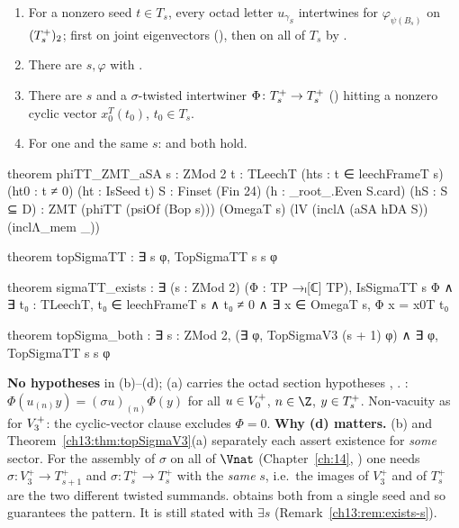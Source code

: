 \begin{theorem}\label{ch13:thm:topSigmaTT}
\begin{enumerate}[label=(\alph*)]
\item For a nonzero seed $t\in T_s$, every octad letter $u_{\gamma_S}$ intertwines for $\varphi_{\psi(B_s)}$ on
  $(T_{s}^{+})_2$; first on joint eigenvectors (), then on all of $T_s$ by .
\item There are $s,\varphi$ with .
\item There are $s$ and a $\sigma$-twisted intertwiner $\Phi\colon T_{s}^{+}\to T_{s}^{+}$ ()
  hitting a nonzero cyclic vector $x_0^T(t_0)$, $t_0\in T_s$.
\item For one and the same $s$:  and  both hold.
\end{enumerate}
\end{theorem}
\begin{leancode}
theorem phiTT_ZMT_aSA {s : ZMod 2} {t : TLeechT} (hts : t ∈ leechFrameT s) (ht0 : t ≠ 0)
    (ht : IsSeed t) {S : Finset (Fin 24)} (h : _root_.Even S.card) (hS : S ⊆ D) :
    ZMT (phiTT (psiOf (Bop s))) (OmegaT s) (lV (inclΛ (aSA hDA S)) (inclΛ_mem _))

theorem topSigmaTT : ∃ s φ, TopSigmaTT s s φ

theorem sigmaTT_exists :
    ∃ (s : ZMod 2) (Φ : TP →ₗ[ℂ] TP), IsSigmaTT s Φ ∧
      ∃ t₀ : TLeechT, t₀ ∈ leechFrameT s ∧ t₀ ≠ 0 ∧ ∃ x ∈ OmegaT s, Φ x = x0T t₀

theorem topSigma_both : ∃ s : ZMod 2, (∃ φ, TopSigmaV3 (s + 1) φ) ∧ ∃ φ, TopSigmaTT s s φ
\end{leancode}
\begin{dictionary}
\textbf{No hypotheses} in (b)--(d); (a) carries the octad section hypotheses , .
: $\Phi(u_{(n)}y)=(\sigma u)_{(n)}\Phi(y)$ for all $u\in V_0^{+}$, $n\in\Z$, $y\in T_{s}^{+}$.
Non-vacuity as for $V_3^{+}$: the cyclic-vector clause excludes $\Phi=0$. \textbf{Why (d) matters.} (b) and
Theorem~\ref{ch13:thm:topSigmaV3}(a) separately each assert existence for \emph{some} sector. For the
assembly of $\sigma$ on all of $\Vnat$ (Chapter~\ref{ch:14}, ) one needs
$\sigma\colon V_3^+\to T_{s+1}^+$ and $\sigma\colon T_s^+\to T_s^+$ with the \emph{same} $s$, i.e.\ the images of $V_3^+$ and of
$T_s^+$ are the two different twisted summands.  obtains both from a single seed
and so guarantees the pattern. It is still stated with $\exists s$ (Remark~\ref{ch13:rem:exists-s}).
\end{dictionary}
